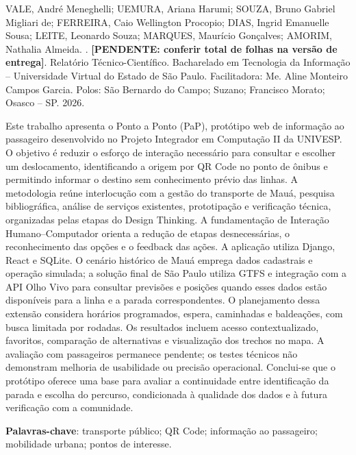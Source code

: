 \documentclass[12pt,oneside,a4paper,brazil,chapter=TITLE]{abntex2}
\newcommand{\pendente}[1]{\textbf{\textcolor{red!65!black}{[PENDENTE: #1]}}}
\begin{document}
\begin{resumo}
\SingleSpacing
\noindent VALE, André Meneghelli; UEMURA, Ariana Harumi; SOUZA, Bruno Gabriel Migliari de; FERREIRA, Caio Wellington Procopio; DIAS, Ingrid Emanuelle Sousa; LEITE, Leonardo Souza; MARQUES, Maurício Gonçalves; AMORIM, Nathalia Almeida. \textit{\imprimirtitulo}. \pendente{conferir total de folhas na versão de entrega}. Relatório Técnico-Científico. Bacharelado em Tecnologia da Informação -- Universidade Virtual do Estado de São Paulo. Facilitadora: Me. Aline Monteiro Campos Garcia. Polos: São Bernardo do Campo; Suzano; Francisco Morato; Osasco -- SP. 2026.
\par\medskip
Este trabalho apresenta o Ponto a Ponto (PaP), protótipo web de informação ao passageiro desenvolvido no Projeto Integrador em Computação II da UNIVESP. O objetivo é reduzir o esforço de interação necessário para consultar e escolher um deslocamento, identificando a origem por QR Code no ponto de ônibus e permitindo informar o destino sem conhecimento prévio das linhas. A metodologia reúne interlocução com a gestão do transporte de Mauá, pesquisa bibliográfica, análise de serviços existentes, prototipação e verificação técnica, organizadas pelas etapas do Design Thinking. A fundamentação de Interação Humano--Computador orienta a redução de etapas desnecessárias, o reconhecimento das opções e o feedback das ações. A aplicação utiliza Django, React e SQLite. O cenário histórico de Mauá emprega dados cadastrais e operação simulada; a solução final de São Paulo utiliza GTFS e integração com a API Olho Vivo para consultar previsões e posições quando esses dados estão disponíveis para a linha e a parada correspondentes. O planejamento dessa extensão considera horários programados, espera, caminhadas e baldeações, com busca limitada por rodadas. Os resultados incluem acesso contextualizado, favoritos, comparação de alternativas e visualização dos trechos no mapa. A avaliação com passageiros permanece pendente; os testes técnicos não demonstram melhoria de usabilidade ou precisão operacional. Conclui-se que o protótipo oferece uma base para avaliar a continuidade entre identificação da parada e escolha do percurso, condicionada à qualidade dos dados e à futura verificação com a comunidade.

\par\vfill
\noindent\textbf{Palavras-chave}: transporte público; QR Code; informação ao passageiro; mobilidade urbana; pontos de interesse.
\end{resumo}
\begingroup
\SingleSpacing
\setlength{\beforechapskip}{0pt}
\setlength{\afterchapskip}{6pt}
\setlength{\cftbeforechapterskip}{2pt}
\setlength{\cftbeforesubsectionskip}{-1.8pt}
\tableofcontents*
\endgroup
\cleardoublepage
\end{document}
